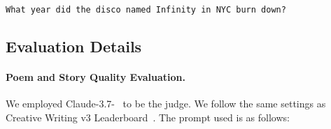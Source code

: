 \begin{tcolorbox}[colback=gray!5!white, colframe=gray!75!black, title=Example Input - SimpleQA:]
\small
\texttt{What year did the disco named Infinity in NYC burn down?}
\end{tcolorbox}




\newpage
\subsection{Evaluation Details}\label{app:evaluation}
\paragraph{Poem and Story Quality Evaluation.}
We employed Claude-3.7-~\citep{anthropic2025claude37} to be the judge. We follow the same settings as Creative Writing v3 Leaderboard~\citep{paech2023eqbench}. The prompt used is as follows:

